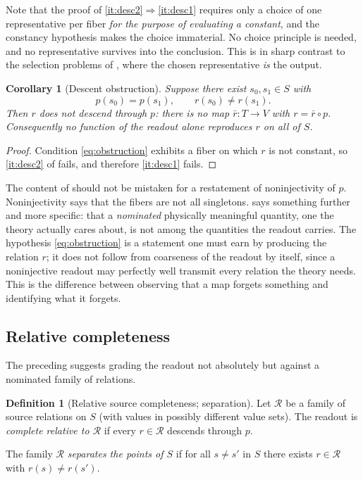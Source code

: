 \documentclass[11pt,reqno]{amsart}
\theoremstyle{plain}
\newtheorem{corollary}[theorem]{Corollary}
\theoremstyle{definition}
\newtheorem{definition}[theorem]{Definition}
\theoremstyle{remark}
\begin{document}
Note that the proof of \ref{it:desc2}$\Rightarrow$\ref{it:desc1} requires only a choice of one representative per fiber \emph{for the purpose of evaluating a constant}, and the constancy hypothesis makes the choice immaterial. No choice principle is needed, and no representative survives into the conclusion. This is in sharp contrast to the selection problems of , where the chosen representative \emph{is} the output.

\begin{corollary}[Descent obstruction]
\label{cor:descentobstruction}
Suppose there exist $s_{0},s_{1}\in S$ with
\begin{equation}
\label{eq:obstruction}
p(s_{0})=p(s_{1}),
\qquad
r(s_{0})\neq r(s_{1}).
\end{equation}
Then $r$ does not descend through $p$: there is no map $\bar r\colon T\to V$ with $r=\bar r\circ p$. Consequently no function of the readout alone reproduces $r$ on all of $S$.
\end{corollary}

\begin{proof}
Condition \eqref{eq:obstruction} exhibits a fiber on which $r$ is not constant, so \ref{it:desc2} of  fails, and therefore \ref{it:desc1} fails.
\end{proof}

The content of  should not be mistaken for a restatement of noninjectivity of $p$. Noninjectivity says that the fibers are not all singletons.  says something further and more specific: that a \emph{nominated} physically meaningful quantity, one the theory actually cares about, is not among the quantities the readout carries. The hypothesis \eqref{eq:obstruction} is a statement one must earn by producing the relation $r$; it does not follow from coarseness of the readout by itself, since a noninjective readout may perfectly well transmit every relation the theory needs. This is the difference between observing that a map forgets something and identifying what it forgets.

\subsection{Relative completeness}

The preceding suggests grading the readout not absolutely but against a nominated family of relations.

\begin{definition}[Relative source completeness; separation]
\label{def:relcomplete}
Let $\mathcal{R}$ be a family of source relations on $S$ (with values in possibly different value sets). The readout is \emph{complete relative to $\mathcal{R}$} if every $r\in\mathcal{R}$ descends through $p$.

The family $\mathcal{R}$ \emph{separates the points of $S$} if for all $s\neq s'$ in $S$ there exists $r\in\mathcal{R}$ with $r(s)\neq r(s')$.
\end{definition}
\end{document}
